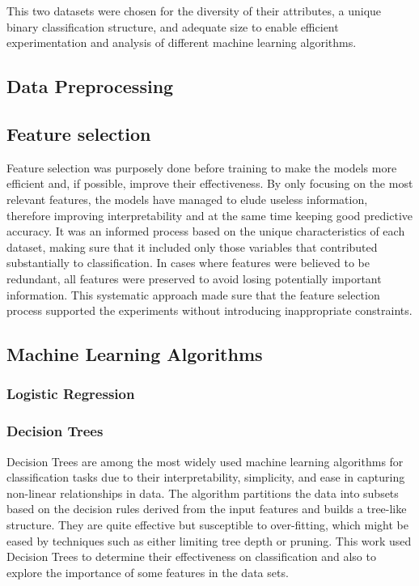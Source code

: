 \documentclass[conference]{IEEEtran}
\begin{document}
This two datasets were chosen for the diversity of their attributes, a unique binary classification structure, and adequate size to enable efficient experimentation and analysis of different machine learning algorithms.

\subsection{Data Preprocessing}

\subsection{Feature selection}
Feature selection was purposely done before training to make the models more efficient and, if possible, improve their effectiveness. By only focusing on the most relevant features, the models have managed to elude useless information, therefore improving interpretability and at the same time keeping good predictive accuracy. It was an informed process based on the unique characteristics of each dataset, making sure that it included only those variables that contributed substantially to classification. In cases where features were believed to be redundant, all features were preserved to avoid losing potentially important information. This systematic approach made sure that the feature selection process supported the experiments without introducing inappropriate constraints.

\subsection{Machine Learning Algorithms}
\subsubsection{Logistic Regression}
\subsubsection{Decision Trees}
Decision Trees are among the most widely used machine learning algorithms for classification tasks due to their interpretability, simplicity, and ease in capturing non-linear relationships in data. The algorithm partitions the data into subsets based on the decision rules derived from the input features and builds a tree-like structure. They are quite effective but susceptible to over-fitting, which might be eased by techniques such as either limiting tree depth or pruning. This work used Decision Trees to determine their effectiveness on classification and also to explore the importance of some features in the data sets.
\end{document}
